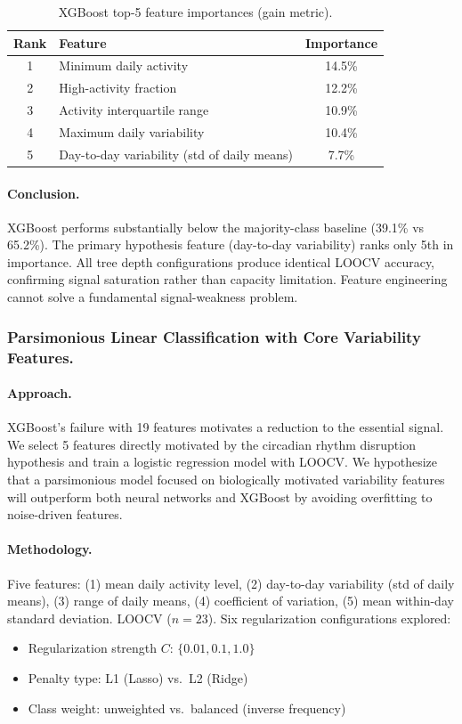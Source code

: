 \begin{table}[H]
\centering
\caption{XGBoost top-5 feature importances (gain metric).}
\label{tab:approach3_1b_features}
\begin{tabular}{clc}
\toprule
\textbf{Rank} & \textbf{Feature} & \textbf{Importance} \\
\midrule
1 & Minimum daily activity & 14.5\% \\
2 & High-activity fraction & 12.2\% \\
3 & Activity interquartile range & 10.9\% \\
4 & Maximum daily variability & 10.4\% \\
5 & Day-to-day variability (std of daily means) & 7.7\% \\
\bottomrule
\end{tabular}
\end{table}

\paragraph{Conclusion.}
XGBoost performs substantially below the majority-class baseline (39.1\% vs 65.2\%). The primary hypothesis feature (day-to-day variability) ranks only 5th in importance. All tree depth configurations produce identical LOOCV accuracy, confirming signal saturation rather than capacity limitation. Feature engineering cannot solve a fundamental signal-weakness problem.

\subsubsection{Parsimonious Linear Classification with Core Variability Features.}

\paragraph{Approach.}
XGBoost's failure with 19 features motivates a reduction to the essential signal. We select 5 features directly motivated by the circadian rhythm disruption hypothesis and train a logistic regression model with LOOCV. We hypothesize that a parsimonious model focused on biologically motivated variability features will outperform both neural networks and XGBoost by avoiding overfitting to noise-driven features.

\paragraph{Methodology.}
Five features: (1) mean daily activity level, (2) day-to-day variability (std of daily means), (3) range of daily means, (4) coefficient of variation, (5) mean within-day standard deviation. LOOCV ($n = 23$). Six regularization configurations explored:
\begin{itemize}[nosep]
  \item Regularization strength $C$: $\{0.01, 0.1, 1.0\}$
  \item Penalty type: L1 (Lasso) vs.\ L2 (Ridge)
  \item Class weight: unweighted vs.\ balanced (inverse frequency)
\end{itemize}

